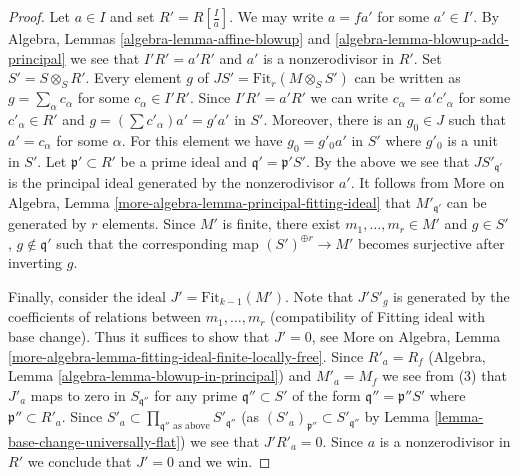 \begin{proof}
\medskip\noindent
Let $a \in I$ and set $R' = R[\frac{I}{a}]$. We may write $a = fa'$
for some $a' \in I'$. By Algebra, Lemmas \ref{algebra-lemma-affine-blowup} and
\ref{algebra-lemma-blowup-add-principal} we see that $I' R' = a'R'$
and $a'$ is a nonzerodivisor in $R'$. Set $S' = S \otimes_S R'$.
Every element $g$ of $JS' = \text{Fit}_r(M \otimes_S S')$ can be
written as $g = \sum_\alpha c_\alpha$ for some $c_\alpha \in I'R'$.
Since $I'R' = a'R'$ we can write $c_\alpha = a'c'_\alpha$ for some
$c'_\alpha \in R'$ and $g = (\sum c'_\alpha)a' = g' a'$ in $S'$.
Moreover, there is an $g_0 \in J$ such that $a' = c_\alpha$
for some $\alpha$. For this element we have $g_0 = g'_0 a'$ in $S'$
where $g'_0$ is a unit in $S'$.
Let $\mathfrak p' \subset R'$ be
a prime ideal and $\mathfrak q' = \mathfrak p'S'$.
By the above we see that $JS'_{\mathfrak q'}$ is the
principal ideal generated by the nonzerodivisor $a'$.
It follows from More on Algebra, Lemma
\ref{more-algebra-lemma-principal-fitting-ideal}
that $M'_{\mathfrak q'}$ can be generated by $r$ elements.
Since $M'$ is finite, there exist $m_1, \ldots, m_r \in M'$ and
$g \in S'$, $g \not \in \mathfrak q'$ such that the corresponding map
$(S')^{\oplus r} \to M'$ becomes surjective after inverting $g$.

\medskip\noindent
Finally, consider the ideal $J' = \text{Fit}_{k - 1}(M')$.
Note that $J'S'_g$ is generated by the coefficients of relations between
$m_1, \ldots, m_r$ (compatibility of Fitting ideal with base change).
Thus it suffices to show that $J' = 0$, see
More on Algebra, Lemma
\ref{more-algebra-lemma-fitting-ideal-finite-locally-free}.
Since $R'_a = R_f$ (Algebra, Lemma \ref{algebra-lemma-blowup-in-principal})
and $M'_a = M_f$ we see from (3)
that $J'_a$ maps to zero in $S_{\mathfrak q''}$ for any prime
$\mathfrak q'' \subset S'$ of the form $\mathfrak q'' = \mathfrak p''S'$
where $\mathfrak p'' \subset R'_a$. Since
$S'_a \subset \prod_{\mathfrak q''\text{ as above}} S'_{\mathfrak q''}$
(as $(S'_a)_{\mathfrak p''} \subset S'_{\mathfrak q''}$ by
Lemma \ref{lemma-base-change-universally-flat})
we see that $J'R'_a = 0$. Since $a$ is a nonzerodivisor in $R'$ we
conclude that $J' = 0$ and we win.
\end{proof}

